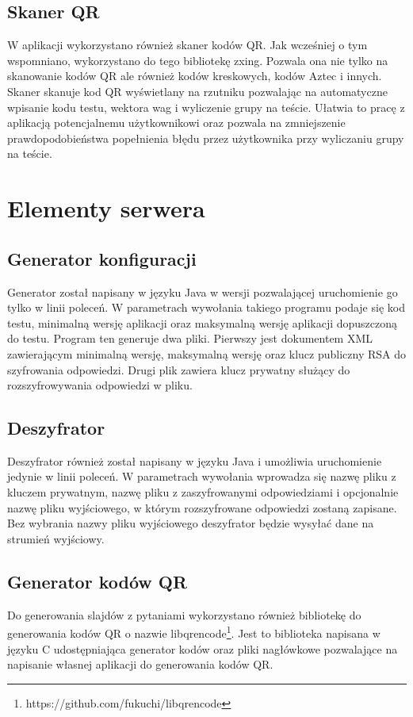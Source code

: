\documentclass{report}
\begin{document}
		\section{Skaner QR}
		
		W aplikacji wykorzystano również skaner kodów QR. Jak wcześniej o tym wspomniano, wykorzystano do tego bibliotekę zxing. Pozwala ona nie tylko na skanowanie kodów QR ale również kodów kreskowych, kodów Aztec i innych. Skaner skanuje kod QR wyświetlany na rzutniku pozwalając na automatyczne wpisanie kodu testu, wektora wag i wyliczenie grupy na teście. Ułatwia to pracę z aplikacją potencjalnemu użytkownikowi oraz pozwala na zmniejszenie prawdopodobieństwa popełnienia błędu przez użytkownika przy wyliczaniu grupy na teście.
		
	\chapter{Elementy serwera}
		
		\section{Generator konfiguracji}
		
		Generator został napisany w języku Java w wersji pozwalającej uruchomienie go tylko w linii poleceń. W parametrach wywołania takiego programu podaje się kod testu, minimalną wersję aplikacji oraz maksymalną wersję aplikacji dopuszczoną do testu. Program ten generuje dwa pliki. Pierwszy jest dokumentem XML zawierającym minimalną wersję, maksymalną wersję oraz klucz publiczny RSA do szyfrowania odpowiedzi. Drugi plik zawiera klucz prywatny służący do rozszyfrowywania odpowiedzi w pliku.
		
		\section{Deszyfrator}
		
		Deszyfrator również został napisany w języku Java i umożliwia uruchomienie jedynie w linii poleceń. W parametrach wywołania wprowadza się nazwę pliku z kluczem prywatnym, nazwę pliku z zaszyfrowanymi odpowiedziami i opcjonalnie nazwę pliku wyjściowego, w którym rozszyfrowane odpowiedzi zostaną zapisane. Bez wybrania nazwy pliku wyjściowego deszyfrator będzie wysyłać dane na strumień wyjściowy.
		
		\section{Generator kodów QR}
		
		Do generowania slajdów z pytaniami wykorzystano również bibliotekę do generowania kodów QR o nazwie libqrencode\footnote{https://github.com/fukuchi/libqrencode}. Jest to biblioteka napisana w języku C udostępniająca generator kodów oraz pliki nagłówkowe pozwalające na napisanie własnej aplikacji do generowania kodów QR.
			
\end{document}

